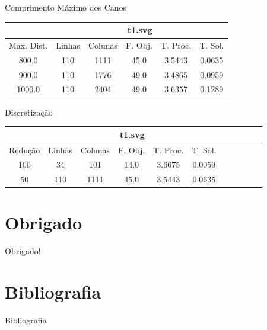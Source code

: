 \documentclass[11pt]{beamer}
\begin{document}
\begin{frame}{Comprimento Máximo dos Canos}
\begin{table}
    \centering
    \begin{tabular}{|c|c|c|c|c|c|}
        \hline
        & \multicolumn{5}{|c|}{t1.svg} \\ \hline
        Max. Dist. & Linhas & Colunas & F. Obj. & T. Proc. & T. Sol.  \\ \hline
        800.0 & 110 & 1111 & 45.0 & 3.5443 & 0.0635  \\ \hline
        900.0 & 110 & 1776 & 49.0 & 3.4865 & 0.0959  \\ \hline
        1000.0 & 110 & 2404 & 49.0 & 3.6357 & 0.1289  \\ \hline
    \end{tabular}
\end{table}
\end{frame}

\begin{frame}{Discretização}
\begin{table}
    \centering
    \begin{tabular}{|c|c|c|c|c|c|c|c|c|c|c|}
        \hline
        & \multicolumn{5}{|c|}{t1.svg}  \\ \hline
        Redução & Linhas & Colunas & F. Obj. & T. Proc. & T. Sol. \\ \hline
        100 & 34 & 101 & 14.0 & 3.6675 & 0.0059 \\ \hline
        50 & 110 & 1111 & 45.0 & 3.5443 & 0.0635 \\ \hline
    \end{tabular}
\end{table}
\end{frame}

\section*{Obrigado}
\begin{frame}
    \begin{center}
        Obrigado!
    \end{center}
\end{frame}

\section*{Bibliografia}
\begin{frame}{Bibliografia}


\end{frame}
\end{document}
